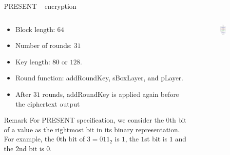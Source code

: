 \begin{frame}{PRESENT -- encryption}
\begin{columns}[T] %
\begin{column}{.55\textwidth}
\begin{itemize}
    \item Block length: $64$
       \item Number of rounds: $31$
       \item Key length: $80$ or $128$.
    \item Round function: addRoundKey, sBoxLayer, and pLayer.
    \item After $31$ rounds, addRoundKey is applied again before the ciphertext output 
\end{itemize}
\begin{alertblock}{Remark}
    For PRESENT specification, we consider the $0$th bit of a value as the rightmost bit in its binary representation.
For example, the $0$th bit of $3=011_2$ is $1$, the $1$st bit is $1$ and the $2$nd bit is $0$.
\end{alertblock}
\end{column}%
\hfill%
\begin{column}{.5\textwidth}
\begin{figure}
    \includegraphics[width=0.6\textwidth]{fig/PRESENT.pdf}
\end{figure}
\end{column}%
\end{columns}
\end{frame}

